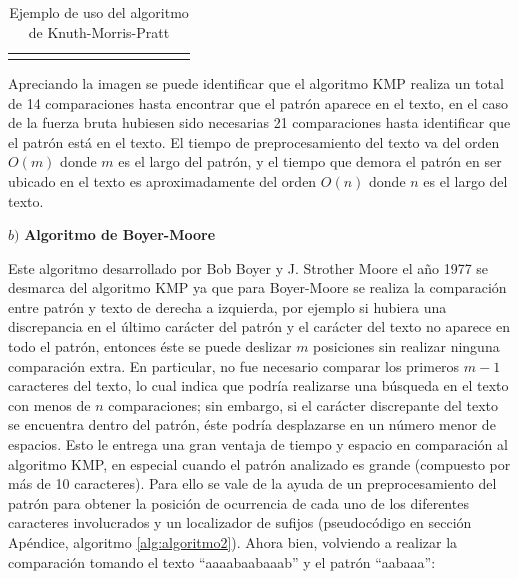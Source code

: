 \begin{table}[h]
\begin{tabular}{lllllllllllll}
                        &                        &                        &                                                &                                                &                        &                                                &                                                &                                                &                                                &                                                &                                                &                       
\end{tabular}
\caption{Ejemplo de uso del algoritmo de Knuth-Morris-Pratt}
\end{table}

Apreciando la imagen se puede identificar que el algoritmo KMP realiza un total de 14 comparaciones hasta encontrar que el patrón aparece en el texto, en el caso de la fuerza bruta hubiesen sido necesarias 21 comparaciones hasta identificar que el patrón está en el texto.
El tiempo de preprocesamiento del texto va del orden $O(m)$ donde $m$ es el largo del patrón, y el tiempo que demora el patrón en ser ubicado en el texto es aproximadamente del orden $O(n)$ donde $n$ es el largo del texto.

$b)$ \textbf{Algoritmo de Boyer-Moore}

Este algoritmo desarrollado por Bob Boyer y J. Strother Moore el año 1977 se desmarca del algoritmo KMP ya que para Boyer-Moore se realiza la comparación entre patrón y texto de derecha a izquierda, por ejemplo si hubiera una discrepancia en el último carácter del patrón y el carácter del texto no aparece en todo el patrón, entonces éste se puede deslizar $m$ posiciones sin realizar ninguna comparación extra. En particular, no fue necesario comparar los primeros $m-1$ caracteres del texto, lo cual indica que podría realizarse una búsqueda en el texto con menos de $n$ comparaciones; sin embargo, si el carácter discrepante del texto se encuentra dentro del patrón, éste podría desplazarse en un número menor de espacios\cite{boyermoore}. Esto le entrega una gran ventaja de tiempo y espacio en comparación al algoritmo KMP, en especial cuando el patrón analizado es grande (compuesto por más de 10 caracteres). Para ello se vale de la ayuda de un preprocesamiento del patrón para obtener la posición de ocurrencia de cada uno de los diferentes caracteres involucrados y un localizador de sufijos (pseudocódigo en sección Apéndice, algoritmo \ref{alg:algoritmo2}). Ahora bien, volviendo a realizar la comparación tomando el texto ``aaaabaabaaab'' y el patrón ``aabaaa'': 

